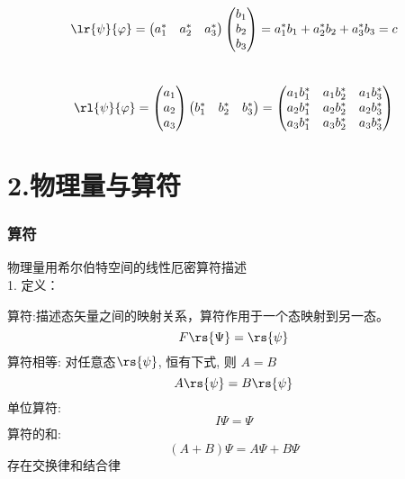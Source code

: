 \begin{frame}{}
        \解 ~ \[\lr{\psi}{\varphi} = \begin{pmatrix}
            a_1 ^* &
            a_2 ^* &
            a_3 ^*
        \end{pmatrix}
            \begin{pmatrix}
            b_1\\
            b_2\\
            b_3
        \end{pmatrix}
        =a_1 ^* b_1 +a_2 ^* b_2 +a_3 ^* b_3
        =c 
        \]
        ~ \[\rl{\psi}{\varphi} = \begin{pmatrix}
            a_1  \\
            a_2  \\
            a_3 
        \end{pmatrix}
            \begin{pmatrix}
            b_1 ^* &
            b_2 ^* &
            b_3 ^*
        \end{pmatrix}
        =  \begin{pmatrix}
            a_1b_1 ^* & a_1b_2 ^* & a_1b_3 ^* \\
            a_2b_1 ^* & a_2b_2 ^* & a_2b_3 ^* \\
            a_3b_1 ^* & a_3b_2 ^* & a_3b_3 ^* 
        \end{pmatrix}
        \]
\end{frame}

\section{2.物理量与算符}

\begin{frame}
    \frametitle{算符}
    物理量用希尔伯特空间的线性厄密算符描述\\
    1. 定义：
    \begin{itemize}
        \Item 算符:描述态矢量之间的映射关系，算符作用于一个态映射到另一态。
        \[F \rs{\Psi}=\rs{\psi}\]
        \Item 算符相等: 对任意态$\rs{\psi}$, 恒有下式, 则 $A= B$ \[ A\rs{\psi}=B\rs{\psi}\]
        \Item 单位算符: \[I\Psi=\Psi \]
        \Item 算符的和:  
        $$ (A+B)\Psi=A\Psi+B\Psi $$
        存在交换律和结合律
    \end{itemize}
\end{frame} 

